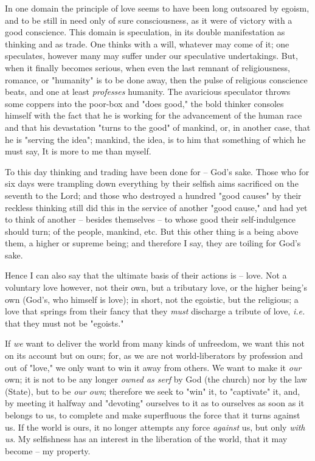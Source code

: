 In one domain the principle of love seems to have been long outsoared by 
egoism, and to be still in need only of sure consciousness, as it were of 
victory with a good conscience. This domain is speculation, in its double 
manifestation as thinking and as trade. One thinks with a will, whatever may 
come of it; one speculates, however many may suffer under our speculative 
undertakings. But, when it finally becomes serious, when even the last remnant 
of religiousness, romance, or "{}humanity"{} is to be done away, then the 
pulse of religious conscience beats, and one at least \textit{professes} 
humanity. The avaricious speculator throws some coppers into the poor-box and 
"{}does good,"{} the bold thinker consoles himself with the fact that he is 
working for the advancement of the human race and that his devastation 
"{}turns to the good"{} of mankind, or, in another case, that he is "{}serving 
the idea"{}; mankind, the idea, is to him that something of which he must say, 
It is more to me than myself.

To this day thinking and trading have been done for -- God's sake. Those who 
for six days were trampling down everything by their selfish aims sacrificed 
on the seventh to the Lord; and those who destroyed a hundred "{}good 
causes"{} by their reckless thinking still did this in the service of another 
"{}good cause,"{} and had yet to think of another -- besides themselves -- to 
whose good their self-indulgence should turn; of the people, mankind, etc. But 
this other thing is a being above them, a higher or supreme being; and 
therefore I say, they are toiling for God's sake.

Hence I can also say that the ultimate basis of their actions is -- love. Not 
a voluntary love however, not their own, but a tributary love, or the higher 
being's own (God's, who himself is love); in short, not the egoistic, but the 
religious; a love that springs from their fancy that they \textit{must} 
discharge a tribute of love, \textit{i.e.} that they must not be 
"{}egoists."{}

If \textit{we} want to deliver the world from many kinds of unfreedom, we want 
this not on its account but on ours; for, as we are not world-liberators by 
profession and out of "{}love,"{} we only want to win it away from others. We 
want to make it \textit{our} own; it is not to be any longer \textit{owned as 
serf} by God (the church) nor by the law (State), but to be \textit{our own}; 
therefore we seek to "{}win"{} it, to "{}captivate"{} it, and, by meeting it 
halfway and "{}devoting"{} ourselves to it as to ourselves as soon as it 
belongs to us, to complete and make superfluous the force that it turns 
against us. If the world is ours, it no longer attempts any force 
\textit{against} us, but only \textit{with us}. My selfishness has an interest 
in the liberation of the world, that it may become -- my property.

